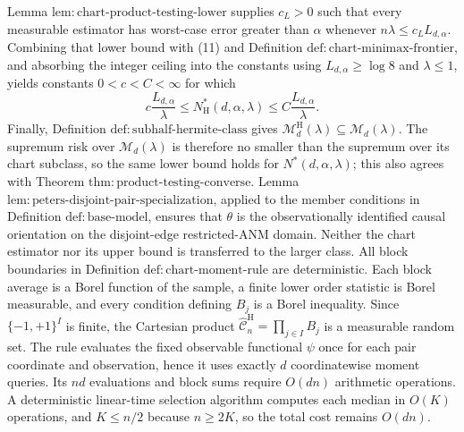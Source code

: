 Lemma \(\mathrm{lem:chart\text{-}product\text{-}testing\text{-}lower}\) supplies \(c_L>0\) such that every measurable estimator has worst-case error greater than \(\alpha\) whenever \(n\lambda\le c_LL_{d,\alpha}\).  Combining that lower bound with (11) and Definition \(\mathrm{def:chart\text{-}minimax\text{-}frontier}\), and absorbing the integer ceiling into the constants using \(L_{d,\alpha}\ge\log8\) and \(\lambda\le1\), yields constants \(0<c<C<\infty\) for which
\[
c\frac{L_{d,\alpha}}{\lambda}
\le N_{\mathrm H}^*(d,\alpha,\lambda)
\le C\frac{L_{d,\alpha}}{\lambda}.
\]
Finally, Definition \(\mathrm{def:subhalf\text{-}hermite\text{-}class}\) gives \(\mathcal M_d^{\mathrm H}(\lambda)\subseteq\mathcal M_d(\lambda)\).  The supremum risk over \(\mathcal M_d(\lambda)\) is therefore no smaller than the supremum over its chart subclass, so the same lower bound holds for \(N^*(d,\alpha,\lambda)\); this also agrees with Theorem \(\mathrm{thm:product\text{-}testing\text{-}converse}\).  Lemma \(\mathrm{lem:peters\text{-}disjoint\text{-}pair\text{-}specialization}\), applied to the member conditions in Definition \(\mathrm{def:base\text{-}model}\), ensures that \(\theta\) is the observationally identified causal orientation on the disjoint-edge restricted-ANM domain.  Neither the chart estimator nor its upper bound is transferred to the larger class.
All block boundaries in Definition \(\mathrm{def:chart\text{-}moment\text{-}rule}\) are deterministic.  Each block average is a Borel function of the sample, a finite lower order statistic is Borel measurable, and every condition defining \(B_j\) is a Borel inequality.  Since \(\{-1,+1\}^I\) is finite, the Cartesian product \(\widehat{\mathcal C}_n^{\mathrm H}=\prod_{j\in I}B_j\) is a measurable random set.  The rule evaluates the fixed observable functional \(\psi\) once for each pair coordinate and observation, hence it uses exactly \(d\) coordinatewise moment queries.  Its \(nd\) evaluations and block sums require \(O(dn)\) arithmetic operations.  A deterministic linear-time selection algorithm computes each median in \(O(K)\) operations, and \(K\le n/2\) because \(n\ge2K\), so the total cost remains \(O(dn)\).


